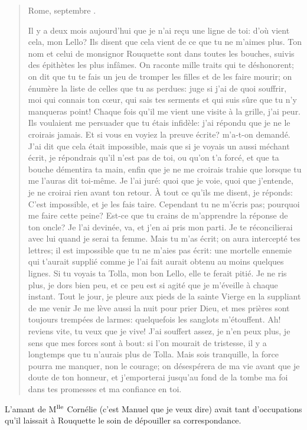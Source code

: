 \begin{quote}

Rome,  septembre .

Il y a deux mois aujourd'hui que je n'ai reçu une ligne de toi: d'où vient cela, mon Lello? Ils disent que cela vient de ce que tu ne m'aimes plus. Ton nom et celui de monsignor Rouquette sont dans toutes les bouches, suivis des épithètes les plus infâmes. On raconte mille traits qui te déshonorent; on dit que tu te fais un jeu de tromper les filles et de les faire mourir; on énumère la liste de celles que tu as perdues: juge si j'ai de quoi souffrir, moi qui connais ton c\oe{}ur, qui sais tes serments et qui suis sûre que tu n'y manqueras point! Chaque fois qu'il me vient une visite à la grille, j'ai peur. Ils voulaient me persuader que tu étais infidèle: j'ai répondu que je ne le croirais jamais. Et si vous en voyiez la preuve écrite? m'a-t-on demandé. J'ai dit que cela était impossible, mais que si je voyais un aussi méchant écrit, je répondrais qu'il n'est pas de toi, ou qu'on t'a forcé, et que ta bouche démentira ta main, enfin que je ne me croirais trahie que lorsque tu me l'auras dit toi-même. Je l'ai juré: quoi que je voie, quoi que j'entende, je ne croirai rien avant ton retour. À tout ce qu'ils me disent, je réponds: C'est impossible, \textemdash{} et je les fais taire. Cependant tu ne m'écris pas; pourquoi me faire cette peine? Est-ce que tu crains de m'apprendre la réponse de ton oncle? Je l'ai devinée, va, et j'en ai pris mon parti. Je te réconcilierai avec lui quand je serai ta femme. Mais tu m'as écrit; on aura intercepté tes lettres; il est impossible que tu ne m'aies pas écrit: une mortelle ennemie qui t'aurait supplié comme je l'ai fait aurait obtenu au moins quelques lignes. Si tu voyais ta Tolla, mon bon Lello, elle te ferait pitié. Je ne ris plus, je dors bien peu, et ce peu est si agité que je m'éveille à chaque instant. Tout le jour, je pleure aux pieds de la sainte Vierge en la suppliant de me venir Je me lève aussi la nuit pour prier Dieu, et mes prières sont toujours trempées de larmes: quelquefois les sanglots m'étouffent. Ah! reviens vite, tu veux que je vive! J'ai souffert assez, je n'en peux plus, je sens que mes forces sont à bout: si l'on mourait de tristesse, il y a longtemps que tu n'aurais plus de Tolla. Mais sois tranquille, la force pourra me manquer, non le courage; on désespérera de ma vie avant que je doute de ton honneur, et j'emporterai jusqu'au fond de la tombe ma foi dans tes promesses et ma confiance en toi.

\end{quote}

L'amant de M$\textsuperscript{lle}$ Cornélie (c'est Manuel que je veux dire) avait tant d'occupations qu'il laissait à Rouquette le soin de dépouiller sa correspondance.

